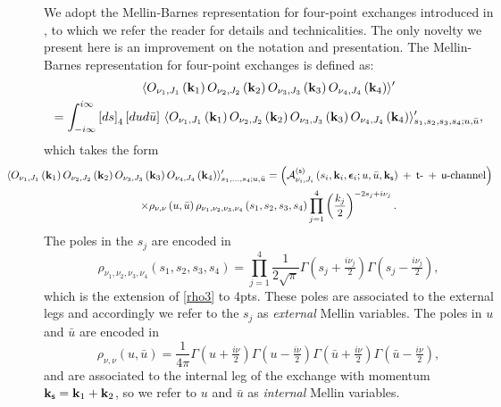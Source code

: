 \documentclass[11pt,a4paper]{article}
\begin{document}
We adopt the Mellin-Barnes representation for four-point exchanges introduced in \cite{Sleight:2019hfp}, to which we refer the reader for details and technicalities. The only novelty we present here is an improvement on the notation and presentation. The Mellin-Barnes representation for four-point exchanges is defined as:
\begin{multline}
    \langle O_{\nu_1,J_1}\left({\bf k}_1\right)O_{\nu_2,J_2}\left({\bf k}_2\right)O_{\nu_3,J_3}\left({\bf k}_3\right) O_{\nu_4,J_4}\left({\bf k}_4\right) \rangle^\prime \\= \int^{i\infty}_{-i\infty} \left[ds\right]_4 \left[du d{\bar u}\right]\, \langle O_{\nu_1,J_1}\left({\bf k}_1\right)O_{\nu_2,J_2}\left({\bf k}_2\right)O_{\nu_3,J_3}\left({\bf k}_3\right) O_{\nu_4,J_4}\left({\bf k}_4\right) \rangle^\prime_{s_1,s_2,s_3,s_4;u,{\bar u}},
\end{multline}
which takes the form
\begin{multline}
  \hspace*{-1.25cm}  \langle O_{\nu_1,J_1}\left({\bf k}_1\right)O_{\nu_2,J_2}\left({\bf k}_2\right)O_{\nu_3,J_3}\left({\bf k}_3\right) O_{\nu_4,J_4}\left({\bf k}_4\right) \rangle^\prime_{s_1,\ldots,s_4;u,{\bar u}}
    = \left({\cal A}^{\left({\sf s}\right)}_{\nu_i,J_i}\left(s_i,{\bf k}_i,\boldsymbol{\epsilon}_i;u,{\bar u},{\bf k}_{\sf s}\right)\:+\: {\sf t}\text{-} \: + \: {\sf u}\text{-channel}\right)\\ \times  \rho_{\nu,\nu}\left(u,{\bar u}\right)\rho_{\nu_1,\nu_2,\nu_3,\nu_4}\left(s_1,s_2,s_3,s_4\right)\prod
   ^4_{j=1}\left(\frac{k_j}{2}\right)^{-2s_j+i\nu_j}.
\end{multline}
The poles in the $s_j$ are encoded in 
\begin{equation}\label{rho4}
    \rho_{\nu_1,\nu_2,\nu_3,\nu_4}\left(s_1,s_2,s_3,s_4\right)=\prod^4_{j=1}\frac{1}{2\sqrt{\pi}}\Gamma\left(s_j+\tfrac{i\nu_j}{2}\right)\Gamma\left(s_j-\tfrac{i\nu_j}{2}\right),
\end{equation}
which is the extension of \eqref{rho3} to 4pts. These poles are associated to the external legs and accordingly we refer to the $s_j$ as \emph{external} Mellin variables. The poles in $u$ and ${\bar u}$ are encoded in \begin{equation}
    \rho_{\nu,\nu}\left(u,{\bar u}\right)=\frac{1}{4\pi}\Gamma\left(u+\tfrac{i\nu}{2}\right)\Gamma\left(u-\tfrac{i\nu}{2}\right)\Gamma\left({\bar u}+\tfrac{i\nu}{2}\right)\Gamma\left({\bar u}-\tfrac{i\nu}{2}\right),
\end{equation}
and are associated to the internal leg of the exchange with momentum ${\bf k}_{\sf s}={\bf k}_1+{\bf k}_2$, so we refer to $u$ and ${\bar u}$ as \emph{internal} Mellin variables.
\end{document}

